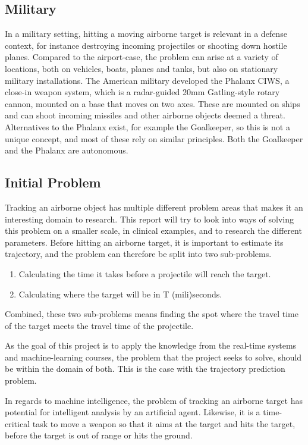 \subsection{Military}
In a military setting, hitting a moving airborne target is relevant in a defense context, for instance destroying incoming projectiles or shooting down hostile planes.
Compared to the airport-case, the problem can arise at a variety of locations, both on vehicles, boats, planes and tanks, but also on stationary military installations.
The American military developed the Phalanx CIWS, a close-in weapon system, which is a radar-guided 20mm Gatling-style rotary cannon, mounted on a base that moves on two axes.
These are mounted on ships and can shoot incoming missiles and other airborne objects deemed a threat.
Alternatives to the Phalanx exist, for example the Goalkeeper, so this is not a unique concept, and most of these rely on similar principles.
Both the Goalkeeper and the Phalanx are autonomous.

\subsection{Initial Problem}

Tracking an airborne object has multiple different problem areas that makes it an interesting domain to research.
This report will try to look into ways of solving this problem on a smaller scale, in clinical examples, and to research the different parameters.
Before hitting an airborne target, it is important to estimate its trajectory, and the problem can therefore be split into two sub-problems.
\begin{enumerate}
  \item Calculating the time it takes before a projectile will reach the target.
  \item Calculating where the target will be in T (mili)seconds.
\end{enumerate}
Combined, these two sub-problems means finding the spot where the travel time of the target meets the travel time of the projectile.


As the goal of this project is to apply the knowledge from the real-time systems and machine-learning courses, the problem that the project seeks to solve, should be within the domain of both.
This is the case with the trajectory prediction problem.


In regards to machine intelligence, the problem of tracking an airborne target has potential for intelligent analysis by an artificial agent.
Likewise, it is a time-critical task to move a weapon so that it aims at the target and hits the target, before the target is out of range or hits the ground.

